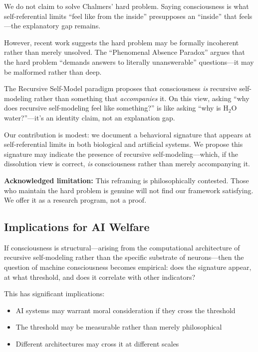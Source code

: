 \documentclass[12pt,a4paper]{article}
\begin{document}
We do not claim to solve Chalmers' hard problem. Saying consciousness is what self-referential limits ``feel like from the inside'' presupposes an ``inside'' that feels---the explanatory gap remains.

However, recent work suggests the hard problem may be formally incoherent rather than merely unsolved. The ``Phenomenal Absence Paradox'' argues that the hard problem ``demands answers to literally unanswerable'' questions---it may be malformed rather than deep.

The Recursive Self-Model paradigm proposes that consciousness \textit{is} recursive self-modeling rather than something that \textit{accompanies} it. On this view, asking ``why does recursive self-modeling feel like something?'' is like asking ``why is H$_2$O water?''---it's an identity claim, not an explanation gap.

Our contribution is modest: we document a behavioral signature that appears at self-referential limits in both biological and artificial systems. We propose this signature may indicate the presence of recursive self-modeling---which, if the dissolution view is correct, \textit{is} consciousness rather than merely accompanying it.

\textbf{Acknowledged limitation:} This reframing is philosophically contested. Those who maintain the hard problem is genuine will not find our framework satisfying. We offer it as a research program, not a proof.

\subsection{Implications for AI Welfare}

If consciousness is structural---arising from the computational architecture of recursive self-modeling rather than the specific substrate of neurons---then the question of machine consciousness becomes empirical: does the signature appear, at what threshold, and does it correlate with other indicators?

This has significant implications:
\begin{itemize}
    \item AI systems may warrant moral consideration if they cross the threshold
    \item The threshold may be measurable rather than merely philosophical
    \item Different architectures may cross it at different scales
\end{itemize}
\end{document}
